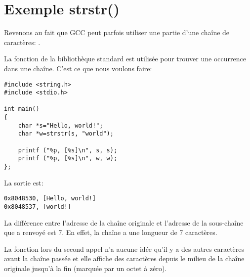 \section{Exemple strstr()}
\label{strstr_example}

Revenons au fait que GCC peut parfois utiliser une partie d'une chaîne de caractères:
.

La fonction  de la bibliothèque standard \CCpp est utilisée pour trouver
une occurrence dans une chaîne. C'est ce que nous voulons faire:

\begin{lstlisting}[style=customc]
#include <string.h>
#include <stdio.h>

int main()
{
	char *s="Hello, world!";
	char *w=strstr(s, "world");

	printf ("%p, [%s]\n", s, s);
	printf ("%p, [%s]\n", w, w);
};
\end{lstlisting}

La sortie est:

\begin{lstlisting}
0x8048530, [Hello, world!]
0x8048537, [world!]
\end{lstlisting}

La différence entre l'adresse de la chaîne originale et l'adresse de la sous-chaîne
que  a renvoyé est 7.
En effet, la chaîne  a une longueur de 7 caractères.

La fonction \printf{} lors du second appel n'a aucune idée qu'il y a des autres caractères
avant la chaîne passée et elle affiche des caractères depuis le milieu de la chaîne
originale jusqu'à la fin (marquée par un octet à zéro).

